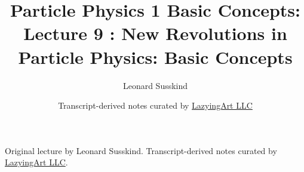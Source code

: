 \documentclass[11pt,oneside]{book}
\begin{document}
\frontmatter
\title{Particle Physics 1 Basic Concepts: Lecture 9 : New Revolutions in Particle Physics: Basic Concepts}
\author{Leonard Susskind}
\date{Transcript-derived notes curated by \href{https://lazying.art}{LazyingArt LLC}}
\maketitle
\begin{center}
\small Original lecture by Leonard Susskind. Transcript-derived notes curated by \href{https://lazying.art}{LazyingArt LLC}.
\end{center}
\clearpage
\mainmatter

\end{document}
